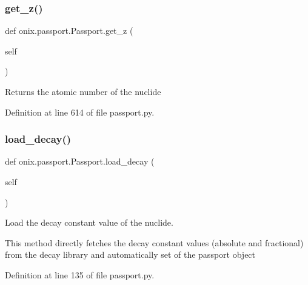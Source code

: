 \mbox{\label{classonix_1_1passport_1_1Passport_a22bf86622c06b66fb337b66227250e1c}} 
\subsubsection{\texorpdfstring{get\+\_\+z()}{get\_z()}}
{\footnotesize\ttfamily def onix.\+passport.\+Passport.\+get\+\_\+z (\begin{DoxyParamCaption}\item[{}]{self }\end{DoxyParamCaption})}

\begin{DoxyVerb}Returns the atomic number of the nuclide\end{DoxyVerb}
 

Definition at line 614 of file passport.\+py.

\mbox{\label{classonix_1_1passport_1_1Passport_a83cc5a53c6bba94690ac0e20e3aca183}} 
\subsubsection{\texorpdfstring{load\+\_\+decay()}{load\_decay()}}
{\footnotesize\ttfamily def onix.\+passport.\+Passport.\+load\+\_\+decay (\begin{DoxyParamCaption}\item[{}]{self }\end{DoxyParamCaption})}

\begin{DoxyVerb}Load the decay constant value of the nuclide.

This method directly fetches the decay constant values (absolute and fractional) from the decay library and automatically set
of the passport object\end{DoxyVerb}
 

Definition at line 135 of file passport.\+py.

\mbox{\label{classonix_1_1passport_1_1Passport_a8cbf0209b52de3af8ff6ca406d4307da}} 
